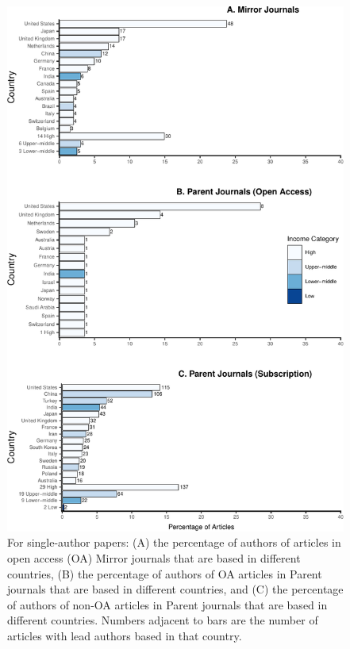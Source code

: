 \documentclass[
  english,
  man]{apa6}
\begin{document}
\begin{figure}

{\centering \includegraphics{Smith_etal_QSS_files/figure-latex/Fig1-1} 

}

\caption{For single-author papers: (A) the percentage of authors of articles in open access (OA) Mirror journals that are based in different countries, (B) the percentage of authors of OA articles in Parent journals that are based in different countries, and (C) the percentage of authors of non-OA articles in Parent journals that are based in different countries. Numbers adjacent to bars are the number of articles with lead authors based in that country.}\label{fig:Fig1}
\end{figure}
\end{document}

